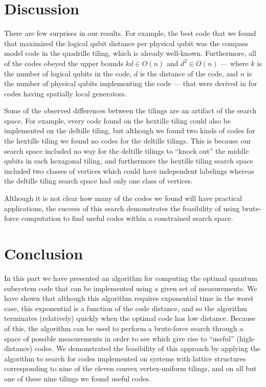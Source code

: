 \documentclass{amsbook}
\theoremstyle{plain}
\theoremstyle{definition}
\theoremstyle{remark}
\begin{document}
\section{Discussion} \label{sec:discussion}

There are few surprises in our results.  For example, the best code that we found that maximized the logical qubit distance per physical qubit was the compass model code in the quadrille tiling, which is already well-known.  Furthermore, all of the codes obeyed the upper bounds $kd\in O(n)$ and $d^2\in O(n)$ --- where $k$ is the number of logical qubits in the code, $d$ is the distance of the code, and $n$ is the number of physical qubits implementing the code --- that were derived in \cite{Bravyi:10a} for codes having spatially local generators.

Some of the observed differences between the tilings are an artifact of the search space.  For example, every code found on the hextille tiling could also be implemented on the deltille tiling, but although we found two kinds of codes for the hextille tiling we found no codes for the deltille tilings.  This is because our search space included no way for the deltille tilings to ``knock out'' the middle qubits in each hexagonal tiling, and furthermore the hextille tiling search space included two classes of vertices which could have independent labelings whereas the deltille tiling search space had only one class of vertices.

Although it is not clear how many of the codes we found will have practical applications, the success of this search demonstrates the feasibility of using brute-force computation to find useful codes within a constrained search space.
\section{Conclusion}
\label{sec:conclusion}

In this part we have presented an algorithm for computing the optimal quantum subsystem code that can be implemented using a given set of measurements.  We have shown that although this algorithm requires exponential time in the worst case, this exponential is a function of the code distance, and so the algorithm terminates (relatively) quickly when the optimal code has low distance.  Because of this, the algorithm can be used to perform a brute-force search through a space of possible measurements in order to see which give rise to ``useful'' (high-distance) codes.  We demonstrated the feasibility of this approach by applying the algorithm to search for codes implemented on systems with lattice structures corresponding to nine of the eleven convex vertex-uniform tilings, and on all but one of these nine tilings we found useful codes.
\end{document}
